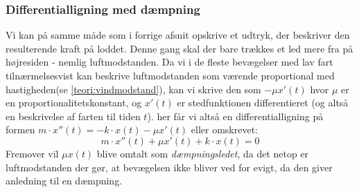\subsubsection{Differentialligning med dæmpning}\label{teori: Opstilling af ligning med dampning}
Vi kan på samme måde som i forrige afsnit opskrive et udtryk, der beskriver den resulterende kraft på loddet. 
Denne gang skal der bare trækkes et led mere fra på højresiden - nemlig luftmodstanden. 
Da vi i de fleste bevægelser med lav fart tilnærmelsesvist kan beskrive luftmodstanden som værende proportional med hastigheden(se \ref{teori:vindmodstand}), kan vi skrive den som $- \mu x'(t)$ hvor $\mu$ er en proportionalitetskonstant, og $x'(t)$ er stedfunktionen differentieret (og altså en beskrivelse af farten til tiden $t$).
her får vi altså en differentialligning på formen $m\cdot x''(t)=-k\cdot x(t)-\mu x'(t)$ eller omskrevet:
$$m\cdot x''(t)+\mu x'(t)+k\cdot x(t)=0$$
Fremover vil $\mu x(t)$ blive omtalt som \textit{dæmpningsledet}, da det netop er luftmodstanden der gør, at bevægelsen ikke bliver ved for evigt, da den giver anledning til en dæmpning. 
